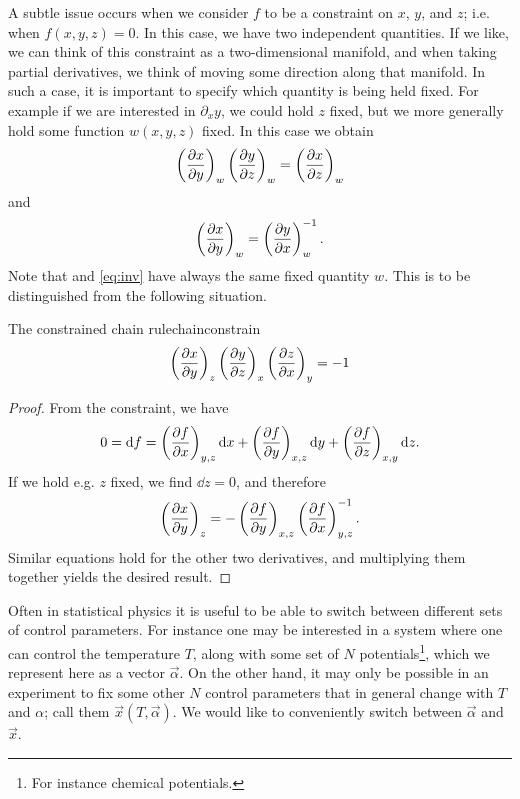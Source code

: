 A subtle issue occurs when we consider $f$ to be a constraint on $x$, $y$,
and $z$; i.e. when $f(x,y,z)=0$. In this case, we have two independent
quantities. If we like, we can think of this constraint as a two-dimensional
manifold, and when taking partial derivatives, we think of moving some direction
along that manifold. In such a case, it is important to specify which quantity
is being held fixed. For example if we are interested in $\partial_x y$, we
could hold $z$ fixed, but we more generally hold some function
$w(x,y,z)$ fixed. In this case we obtain
\begin{equation}\label{eq:chainw}
\left(\pdv{x}{y}\right)_w
\left(\pdv{y}{z}\right)_w
=\left(\pdv{x}{z}\right)_w
\end{equation}
and
\begin{equation}\label{eq:inv}
\left(\pdv{x}{y}\right)_w
=\left(\pdv{y}{x}\right)_w^{-1}.
\end{equation}
Note that  and \eqref{eq:inv} have always the same
fixed quantity $w$. This is to be distinguished from the following
situation.

\begin{proposition}{The constrained chain rule}{chainconstrain}
$$
\left(\pdv{x}{y}\right)_z
\left(\pdv{y}{z}\right)_x
\left(\pdv{z}{x}\right)_y
=-1
$$
\begin{proof}
From the constraint, we have
\begin{equation*}
0=\dd f=
 \left(\pdv{f}{x}\right)_{y,z}\dd x
+\left(\pdv{f}{y}\right)_{x,z}\dd y
+\left(\pdv{f}{z}\right)_{x,y}\dd z.
\end{equation*}
If we hold e.g. $z$ fixed, we find $\dd z=0$, and therefore
\begin{equation*}
\left(\pdv{x}{y}\right)_z=-\left(\pdv{f}{y}\right)_{x,z}\left(\pdv{f}{x}\right)_{y,z}^{-1}.
\end{equation*}
Similar equations hold for the other two derivatives, and multiplying them
together yields the desired result.
\end{proof}
\end{proposition}
                         

Often in statistical physics it is useful to be able to switch between different
sets of control parameters. For instance one may be interested in a system where
one can control the temperature $T$, along with some set of $N$
potentials\footnote{For instance chemical potentials.},
which we represent here as a vector $\vec\alpha$. On the other hand, it may only
be possible in an experiment to fix some other $N$ control parameters that in
general change with $T$ and $\alpha$; call them $\vec{x}(T,\vec\alpha)$. We
would like to conveniently switch between $\vec\alpha$ and $\vec{x}$.

